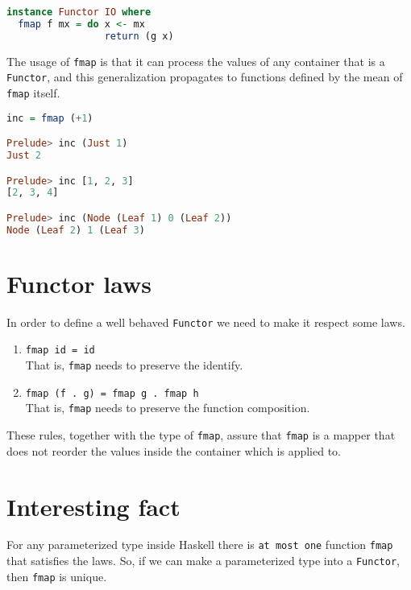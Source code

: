 \begin{lstlisting}[language=haskell]
instance Functor IO where
  fmap f mx = do x <- mx
                 return (g x)
\end{lstlisting}

The usage of \texttt{fmap} is that it can process the values of any container that is a \texttt{Functor}, and this generalization propagates to functions defined by the mean of \texttt{fmap} itself. 

\begin{lstlisting}[language=haskell]
inc = fmap (+1)

Prelude> inc (Just 1)
Just 2

Prelude> inc [1, 2, 3]
[2, 3, 4]

Prelude> inc (Node (Leaf 1) 0 (Leaf 2))
Node (Leaf 2) 1 (Leaf 3) 
\end{lstlisting}

\section{Functor laws}
In order to define a well behaved \texttt{Functor} we need to make it respect some laws. 

\begin{enumerate}
	\item \texttt{fmap id = id} \\
		  That is, \texttt{fmap} needs to preserve the identify.
		  
	\item \texttt{fmap (f . g) = fmap g . fmap h} \\
		   That is, \texttt{fmap} needs to preserve the function composition.
\end{enumerate}

These rules, together with the type of \texttt{fmap}, assure that \texttt{fmap} is a mapper that does not reorder the values inside the container which is applied to.

\section{Interesting fact}
For any parameterized type inside Haskell there is \texttt{at most one} function \texttt{fmap} that satisfies the laws. So, if we can make a parameterized type into a \texttt{Functor}, then \texttt{fmap} is unique.
